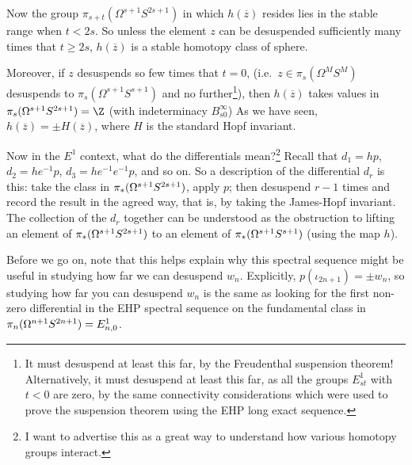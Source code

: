 \begin{enumerate}
Now the group $\pi_{s+t}(\Omega^{s+1}S^{2s+1})$ in which $h(\overline z)$ resides lies in the stable range when $t<2s$. So unless the element $z$ can be desuspended sufficiently many times that $t\geq2s$, $h(\overline z)$ is a stable homotopy class of sphere.

Moreover, if $z$ desuspends so few times that $t=0$, (i.e.\ $z\in\pi_s(\Omega^M S^M)$ desuspends to $\pi_s(\Omega^{s+1} S^{s+1})$ and no further\footnote{It must desuspend at least this far, by the Freudenthal suspension theorem! Alternatively, it must desuspend at least this far, as all the groups $E_{st}^1$ with $t<0$ are zero, by the same connectivity considerations which were used to prove the suspension theorem using the EHP long exact sequence.}), then $h(\overline z)$ takes values in $\pi_{s}(\Omega^{s+1}S^{2s+1})=\Z$ (with indeterminacy $B_{s0}^\infty$) As we have seen, $h(\overline z)=\pm H(\overline z)$, where $H$ is the standard Hopf invariant.
\end{enumerate}



Now in the $E^1$ context, what do the differentials mean?\footnote{I want to advertise this as a great way to understand how various homotopy groups interact.}  Recall that $d_1 = hp$, $d_2 = he^{-1} p$, $d_3 = he^{-1} e^{-1} p$, and so on.  So a description of the differential $d_r$ is this: take the class in $\pi_* (\Omega^{s+1} S^{2s+1})$, apply $p$; then desuspend $r-1$ times and record the result in the agreed way, that is, by taking the James-Hopf invariant. The collection of the $d_r$ together can be understood as the obstruction to lifting an element of $\pi_*(\Omega^{s+1} S^{2s+1})$ to an element of $\pi_*(\Omega^{s+1} S^{s+1})$ (using the map $h$).

Before we go on, note that this helps explain why this spectral sequence might be useful in studying how far we can desuspend $w_n$. Explicitly, $p(\iota_{2n+1}) = \pm w_n$, so studying how far you can desuspend $w_n$ is the same as looking for the first non-zero differential in the EHP spectral sequence on the fundamental class in $\pi_n (\Omega^{n+1} S^{2n+1})=E^1_{n,0}$.


